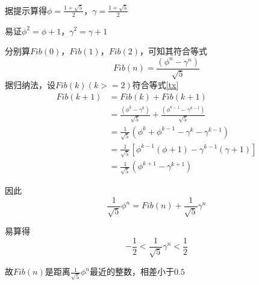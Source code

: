 \documentclass{ctexart}
\date{} %
\title{}
\author{}
\begin{document}
\maketitle


\noindent 据提示算得$\phi=\frac{1+\sqrt{5}}{2}$，$\gamma=\frac{1+\sqrt{5}}{2}$

\noindent 易证$\phi^2=\phi+1$，$\gamma^2=\gamma+1$

\noindent 分别算$Fib(0)$，$Fib(1)$，$Fib(2)$，可知其符合等式
\begin{equation}
Fib(n)=\frac{(\phi^n-\gamma^n)}{\sqrt{5}}\label{tx}
\end{equation}
据归纳法，设$Fib(k) (k>=2)$符合等式\ref{tx}
\begin{equation}
\begin{aligned}
Fib(k + 1)&=Fib(k)+Fib(k+1) \\
	&=\frac{(\phi^k-\gamma^k)}{\sqrt{5}} + \frac{(\phi^{k-1}-\gamma^{k-1})}{\sqrt{5}} \\
	&=\frac{1}{\sqrt{5}}\left(\phi^k+\phi^{k-1}-\gamma^k-\gamma^{k-1}\right) \\
	&=\frac{1}{\sqrt{5}}\left[\phi^{k-1}\left(\phi+1\right)-\gamma^{k-1}\left(\gamma+1\right)\right] \\
	&=\frac{1}{\sqrt{5}}\left(\phi^{k+1}-\gamma^{k+1}\right)
\end{aligned}
\end{equation}

\noindent 因此
\begin{equation}
\frac{1}{\sqrt{5}}\phi^n=Fib(n)+\frac{1}{\sqrt{5}}\gamma^n
\end{equation}

\noindent 易算得
\begin{equation}
-\frac{1}{2}<\frac{1}{\sqrt{5}}\gamma^n<\frac{1}{2}
\end{equation}

\noindent 故$Fib(n)$是距离$\frac{1}{\sqrt{5}}\phi^n$最近的整数，相差小于$0.5$
\end{document}
